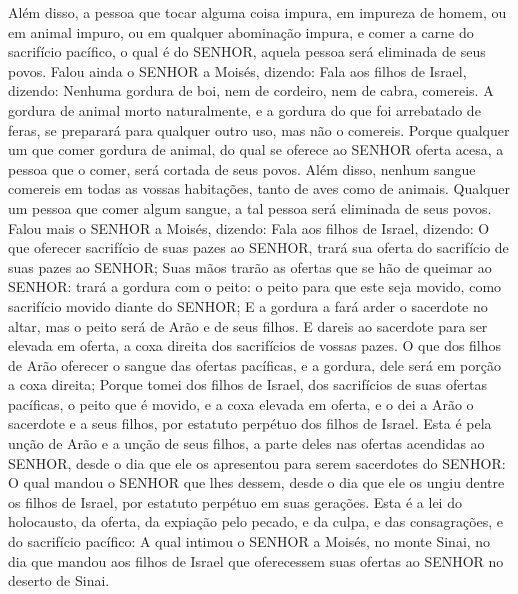{Além disso, a pessoa que tocar alguma coisa impura, em impureza de homem, ou em animal impuro, ou em qualquer abominação impura, e comer a carne do sacrifício pacífico, o qual é do SENHOR, aquela pessoa será eliminada de seus povos.
Falou ainda o SENHOR a Moisés, dizendo:
Fala aos filhos de Israel, dizendo: Nenhuma gordura de boi, nem de cordeiro, nem de cabra, comereis.
A gordura de animal morto naturalmente, e a gordura do que foi arrebatado de feras, se preparará para qualquer outro uso, mas não o comereis.
Porque qualquer um que comer gordura de animal, do qual se oferece ao SENHOR oferta acesa, a pessoa que o comer, será cortada de seus povos.
Além disso, nenhum sangue comereis em todas as vossas habitações, tanto de aves como de animais.
Qualquer um pessoa que comer algum sangue, a tal pessoa será eliminada de seus povos.
Falou mais o SENHOR a Moisés, dizendo:
Fala aos filhos de Israel, dizendo: O que oferecer sacrifício de suas pazes ao SENHOR, trará sua oferta do sacrifício de suas pazes ao SENHOR;
Suas mãos trarão as ofertas que se hão de queimar ao SENHOR: trará a gordura com o peito: o peito para que este seja movido, como sacrifício movido diante do SENHOR;
E a gordura a fará arder o sacerdote no altar, mas o peito será de Arão e de seus filhos.
E dareis ao sacerdote para ser elevada em oferta, a coxa direita dos sacrifícios de vossas pazes.
O que dos filhos de Arão oferecer o sangue das ofertas pacíficas, e a gordura, dele será em porção a coxa direita;
Porque tomei dos filhos de Israel, dos sacrifícios de suas ofertas pacíficas, o peito que é movido, e a coxa elevada em oferta, e o dei a Arão o sacerdote e a seus filhos, por estatuto perpétuo dos filhos de Israel.
Esta é pela unção de Arão e a unção de seus filhos, a parte deles nas ofertas acendidas ao SENHOR, desde o dia que ele os apresentou para serem sacerdotes do SENHOR:
O qual mandou o SENHOR que lhes dessem, desde o dia que ele os ungiu dentre os filhos de Israel, por estatuto perpétuo em suas gerações.
Esta é a lei do holocausto, da oferta, da expiação pelo pecado, e da culpa, e das consagrações, e do sacrifício pacífico:
A qual intimou o SENHOR a Moisés, no monte Sinai, no dia que mandou aos filhos de Israel que oferecessem suas ofertas ao SENHOR no deserto de Sinai.

}
